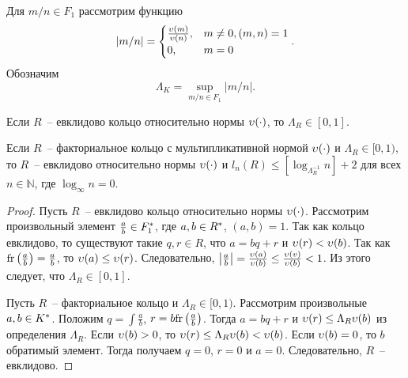 \documentclass[_00_dissertation.tex]{subfiles}
\begin{document}
\begin{definition}\label{definition:euclidean_lambda}
    Для $m/n \in F_1$ рассмотрим функцию
    \begin{equation*}
        |m/n| = \begin{cases}
            \frac{\upsilon(m)}{\upsilon(n)}, & m \neq 0, (m, n) = 1\\
            0, & m = 0
        \end{cases}.
    \end{equation*}
    Обозначим
    \begin{equation*}
        \Lambda_K = \sup_{m/n \in F_1} |m/n|.
    \end{equation*}
\end{definition}

\begin{theorem}\label{theorem:euclidean_and_lambda}
    Если $R$~-- евклидово кольцо относительно нормы $\upsilon(\cdot)$, то $\Lambda_R \in [0, 1]$.

    Если $R$~-- факториальное кольцо с мультипликативной нормой $\upsilon(\cdot)$ и $\Lambda_R \in [0, 1)$, то $R$~-- евклидово относительно нормы $\upsilon(\cdot)$ и $l_n(R) \le [\log_{\Lambda_R^{-1}} n] + 2$ для всех $n \in \mathbb{N}$, где $\log_{\infty} n = 0$.
\end{theorem}
\begin{proof}
    Пусть $R$~-- евклидово кольцо относительно нормы $\upsilon(\cdot)$.
    Рассмотрим произвольный элемент $\frac{a}{b} \in F_1^{*}$, где $a, b \in R^{*}$, $(a, b) = 1$.
    Так как кольцо евклидово, то существуют такие $q, r \in R$, что $a = bq + r$ и $\upsilon(r) < \upsilon(b)$.
    Так как $\textrm{fr}\left(\frac{a}{b}\right) = \frac{a}{b}$, то $\upsilon(a) \le \upsilon(r)$.
    Следовательно, $\left|\frac{a}{b}\right| = \frac{\upsilon(a)}{\upsilon(b)} \le \frac{\upsilon(v)}{\upsilon(b)} < 1$.
    Из этого следует, что $\Lambda_R \in [0, 1]$.

    Пусть $R$~-- факториальное кольцо и $\Lambda_R \in [0, 1)$.
    Рассмотрим произвольные $a, b \in K^{*}$.
    Положим $q = \int{\frac{a}{b}}$, $r = b\textrm{fr}\left(\frac{a}{b}\right)$.
    Тогда $a = bq + r$ и $\upsilon(r) \le \Lambda_R \upsilon(b)$ из определения $\Lambda_R$.
    Если $\upsilon(b) > 0$, то $\upsilon(r) \le \Lambda_R \upsilon(b) < \upsilon(b)$.
    Если $\upsilon(b) = 0$, то $b$ обратимый элемент.
    Тогда получаем $q = 0$, $r = 0$ и $a = 0$.
    Следовательно, $R$~-- евклидово.
\end{proof}
\end{document}
